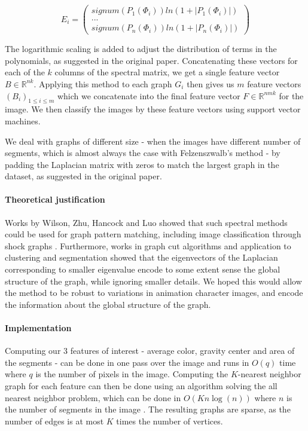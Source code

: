 \[
E_i = \begin{pmatrix}
signum(P_1(\Phi_i)) ln(1 + |P_1(\Phi_i)|) \\
... \\
signum(P_n(\Phi_i)) ln(1 + |P_n(\Phi_i)|)
\end{pmatrix}
\] 

The logarithmic scaling is added to adjust the distribution of terms in the polynomials, as suggested in the original paper. Concatenating these vectors for each of the $k$ columns of the spectral matrix, we get a single feature vector $B \in \mathbb{R}^{nk}$. Applying this method to each graph $G_i$ then gives us $m$ feature vectors $(B_i)_{1 \leq i \leq m}$ which we concatenate into the final feature vector $F \in \mathbb{R}^{nmk}$ for the image. We then classify the images by these feature vectors using support vector machines.

We deal with graphs of different size - when the images have different number of segments, which is almost always the case with Felzenszwalb's method - by padding the Laplacian matrix with zeros to match the largest graph in the dataset, as suggested in the original paper.

\paragraph{Theoretical justification}
Works by Wilson, Zhu, Hancock and Luo showed that such spectral methods could be used for graph pattern matching, including image classification through shock graphs \cite{wilson2005pattern}\cite{wilson2008study}. Furthermore, works in graph cut algorithms and application to clustering \cite{ng2002spectral} and segmentation\cite{shi2000normalized}\cite{meila2001random} showed that the eigenvectors of the Laplacian corresponding to smaller eigenvalue encode to some extent sense the global structure of the graph, while ignoring smaller details. We hoped this would allow the method to be robust to variations in animation character images, and encode the information about the global structure of the graph.

\paragraph{Implementation}
Computing our $3$ features of interest - average color, gravity center and area of the segments - can be done in one pass over the image and runs in $O(q)$ time where $q$ is the number of pixels in the image. Computing the $K$-nearest neighbor graph for each feature can then be done using an algorithm solving the all nearest neighbor problem, which can be done in $O(Kn\log(n))$ where $n$ is the number of segments in the image \cite{clarkson1983fast}. The resulting graphs are sparse, as the number of edges is at most $K$ times the number of vertices.

